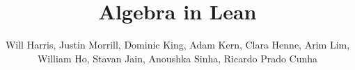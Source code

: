 \title{Algebra in Lean}
\author{Will Harris, Justin Morrill, Dominic King, Adam Kern, Clara Henne, Arim Lim, 
William Ho, Stavan Jain, Anoushka Sinha, Ricardo Prado Cunha}


\maketitle


